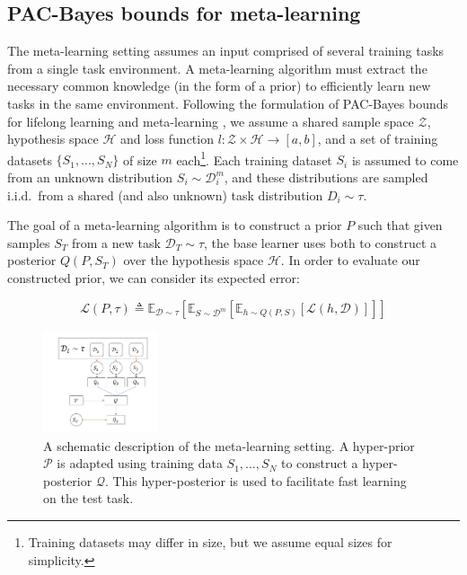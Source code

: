 \documentclass[letterpaper]{article} %
\theoremstyle{definition}
\newcommand{\Expect}[2]{\mathbb{E}_{#1}\left [#2 \right ]}
\begin{document}
\subsection{PAC-Bayes bounds for meta-learning} \label{sec:meta}

The meta-learning setting assumes an input comprised of several training tasks from a single task environment. A meta-learning algorithm must extract the necessary common knowledge (in the form of a prior) to efficiently learn new tasks in the same environment. Following the formulation of PAC-Bayes bounds for lifelong learning \citep{Pentina2014} and meta-learning \citep{Amit2018}, we assume a shared sample space $\mathcal{Z}$, hypothesis space $\mathcal{H}$ and loss function $l:\mathcal{Z}\times \mathcal{H}\rightarrow [a,b]$, and a set of training datasets $\{S_1,...,S_N\}$ of size $m$ each\footnote{Training datasets may differ in size, but we assume equal sizes for simplicity.}. Each training dataset $S_i$ is assumed to come from an unknown distribution $S_i\sim \mathcal{D}^m_i$, and these distributions are sampled i.i.d.\ from a shared (and also unknown) task distribution $D_i\sim \tau$.

The goal of a meta-learning algorithm is to construct a prior $P$ such that given samples $S_T$ from a new task $\mathcal{D}_T\sim \tau$, the base learner uses both to construct a posterior $Q(P, S_T)$ over the hypothesis space $\mathcal{H}$. In order to evaluate our constructed prior, we can consider its expected error:

\begin{equation}
\mathcal{L}(P, \tau)\triangleq \Expect{\mathcal{D}\sim \tau}{\Expect{S\sim \mathcal{D}^m}{\Expect{h\sim Q(P, S)}{\mathcal{L}(h, \mathcal{D})}}}
\end{equation}

\begin{figure}[t]
	\centering
	\includegraphics[width=0.3\textwidth]{setup_ml.PNG}
	\caption{A schematic description of the meta-learning setting. A hyper-prior $\mathcal{P}$ is adapted using training data $S_1,\ldots,S_N$ to construct a hyper-posterior $\mathcal{Q}$. This hyper-posterior is used to facilitate fast learning on the test task.}
	\label{fig:meta-learning-setting}
\end{figure}
\end{document}
